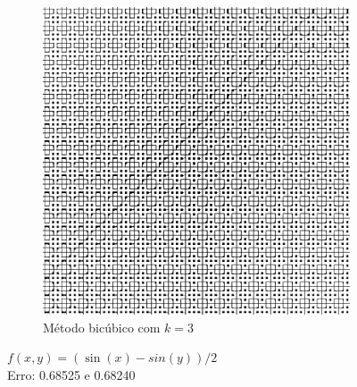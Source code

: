 \documentclass[leqno]{article}
\begin{document}
\begin{figure}[H]
\begin{subfigure}{.33\textwidth}
        \includegraphics[width=.7\linewidth]{../images/func_1_bic.png}
        \caption{Método bicúbico com $k = 3$}
        \label{fig:sub1}
      \end{subfigure}%
    \caption{$f(x,y) = (\sin(x) - sin(y))/2$ \\ Erro: 0.68525 e 0.68240}
    \label{fig:test}
\end{figure}
\end{document}
